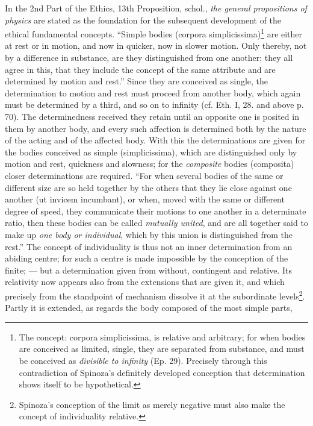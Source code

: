 \documentclass[12pt,a4paper,openany]{book}
\newcommand{\opage}[1]{\marginnote{\footnotesize\textit{[#1]}}}
\begin{document}
In the 2nd Part of the Ethics, 13th Proposition, schol., \emph{the general
propositions of physics} are stated as the foundation for
the subsequent development of the ethical fundamental concepts.
``Simple bodies (corpora
simplicissima)\footnote{The concept: corpora simplicissima, is
relative and arbitrary; for when bodies are conceived as
limited, single, they are separated from substance, and must be
conceived as \emph{divisible to infinity} (Ep. 29). Precisely through this
contradiction of Spinoza's definitely developed conception that
determination shows itself to be hypothetical.} are either at rest or in
motion, and now in quicker, now in slower motion.
Only thereby, not by a difference in substance, are they distinguished from
one another; they all agree in this, that they include the
concept of the same attribute and are determined by motion and rest.''
Since they are conceived as single, the determination to motion and
rest must proceed from another body, which again must be determined by a
third, and so on to infinity (cf. Eth. I, 28. and above
p. 70). The determinedness received they retain until an
opposite one is posited in them by another body, and every such
affection is determined both by the nature of the acting and of the affected
body. With this the determinations are given for the bodies conceived as
simple (simplicissima), which are distinguished only
by motion and rest, quickness and slowness; for the
\emph{composite} bodies (composita) closer determinations are required.
``For when several bodies of the same or different size are
so held together by the others that they lie close against one another
(ut invicem incumbant), or when, moved with the same
or different degree of speed, they communicate their motions to one another in a determinate
ratio, then these bodies can be called
\emph{mutually united}, and are all together said to make up \emph{one
body or individual}, which by this
\opage{80}\setcounter{footnote}{0}union is distinguished from the rest.'' The concept of individuality is
thus not an inner determination from an abiding centre; for
such a centre is made impossible by the conception of the finite; ---
but a determination given from without, contingent and relative. Its
relativity now appears also from the extensions that are given it,
and which precisely from the standpoint of mechanism dissolve it at the
subordinate levels\footnote{Spinoza's conception of the limit
as merely negative must also make the concept of individuality relative.}.
Partly it is extended, as regards the body composed of the most simple parts,
\end{document}
